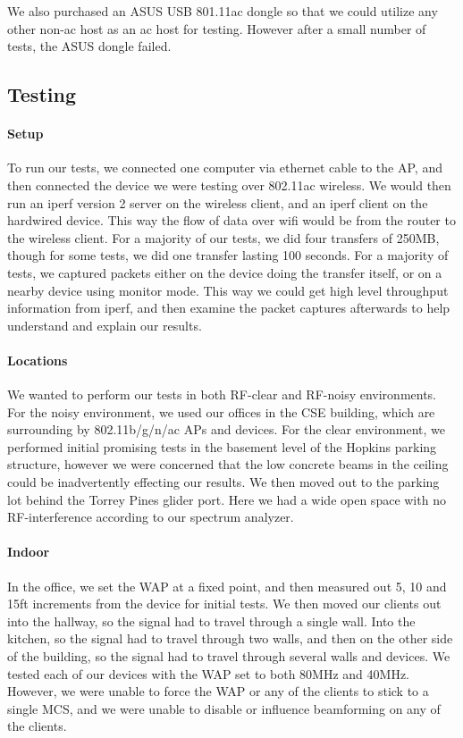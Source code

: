 We also purchased an ASUS USB 801.11ac dongle so that we could utilize any other
non-ac host as an ac host for testing. However after a small number of tests,
the ASUS dongle failed.

\subsection{Testing}

\paragraph{Setup}
To run our tests, we connected one computer via ethernet cable to the AP, and
then connected the device we were testing over 802.11ac wireless. We would then
run an iperf version 2  server on the wireless client, and
an iperf client on the hardwired device. This way the flow of data over wifi
would be from the router to the wireless client. For a majority of our tests, we
did four transfers of 250MB, though for some tests, we did one transfer lasting
100 seconds. For a majority of tests, we captured packets either on the device
doing the transfer itself, or on a nearby device using monitor mode. This way
we could get high level throughput information from iperf, and then examine the
packet captures afterwards to help understand and explain our results.

\paragraph{Locations}
We wanted to perform our tests in both RF-clear and RF-noisy environments. For
the noisy environment, we used our offices in the CSE building, which are
surrounding by 802.11b/g/n/ac APs and devices. For the clear environment, we
performed initial promising tests in the basement level of the Hopkins parking
structure, however we were concerned that the low concrete beams in the ceiling
could be inadvertently effecting our results. We then moved out to the parking
lot behind the Torrey Pines glider port. Here we had a wide open space with no
RF-interference according to our spectrum analyzer.


\paragraph{Indoor}
In the office, we set the WAP at a fixed point, and then measured out 5, 10 and
15ft increments from the device for initial tests. We then moved our clients out
into the hallway, so the signal had to travel through a single wall. Into the
kitchen, so the signal had to travel through two walls, and then on the other
side of the building, so the signal had to travel through several walls and
devices. We tested each of our devices with the WAP set to both 80MHz and 40MHz.
However, we were unable to force the WAP or any of the clients to stick to a
single MCS, and we were unable to disable or influence beamforming on any of the
clients.


